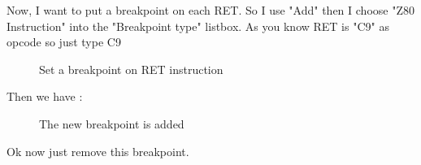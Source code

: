 \documentclass[10pt]{report}
\begin{document}
Now, I want to put a breakpoint on each RET.\newline
So I use "Add" then I choose "Z80 Instruction" into the "Breakpoint type" listbox.\newline
As you know RET is "C9" as opcode so just type C9 
\begin{figure}[H]
\centering
{}
\caption{Set a breakpoint on RET instruction}
\end{figure}

Then we have :\newline
\begin{figure}[H]
\centering
{}
\caption{The new breakpoint is added}
\end{figure}
Ok now just remove this breakpoint.\newline
\end{document}
